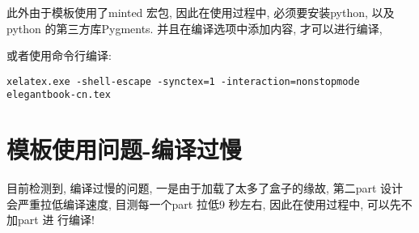 此外由于模板使用了minted 宏包, 因此在使用过程中, 必须要安装python, 以及python 的第三方库Pygments.
并且在编译选项中添加内容, 才可以进行编译,

或者使用命令行编译:
\begin{verbatim}
xelatex.exe -shell-escape -synctex=1 -interaction=nonstopmode elegantbook-cn.tex
\end{verbatim}
\fi
\section{模板使用问题-编译过慢}
目前检测到, 编译过慢的问题, 一是由于加载了太多了盒子的缘故,
第二part 设计会严重拉低编译速度, 目测每一个part 拉低9 秒左右, 因此在使用过程中, 可以先不加part 进
行编译!

